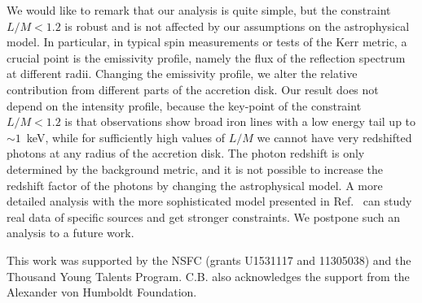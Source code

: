 \documentclass[aps, prd, amsmath, floats, floatfix, twocolumn, nofootinbib, superscriptaddress, showpacs]{revtex4-1}
\begin{document}
We would like to remark that our analysis is quite simple, but the constraint $L/M < 1.2$ is robust and is not affected by our assumptions on the astrophysical model. In particular, in typical spin measurements or tests of the Kerr metric, a crucial point is the emissivity profile, namely the flux of the reflection spectrum at different radii. Changing the emissivity profile, we alter the relative contribution from different parts of the accretion disk. Our result does not depend on the intensity profile, because the key-point of the constraint $L/M < 1.2$ is that observations show broad iron lines with a low energy tail up to $\sim 1$~keV, while for sufficiently high values of $L/M$ we cannot have very redshifted photons at any radius of the accretion disk. The photon redshift is only determined by the background metric, and it is not possible to increase the redshift factor of the photons by changing the astrophysical model. A more detailed analysis with the more sophisticated model presented in Ref.~\cite{next} can study real data of specific sources and get stronger constraints. We postpone such an analysis to a future work.








\begin{acknowledgments}
This work was supported by the NSFC (grants U1531117 and 11305038) and the Thousand Young Talents Program. C.B. also acknowledges the support from the Alexander von Humboldt Foundation.
\end{acknowledgments}

\pagebreak

\end{document}
